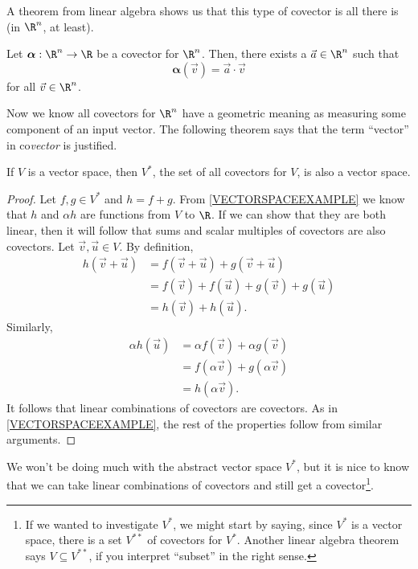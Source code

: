 A theorem from linear algebra shows us that this type of covector
is all there is (in $\R^n$, at least).

\begin{theorem}
	Let $\bm\alpha:\R^n\to \R$ be a covector for $\R^n$.  Then,
	there exists a $\vec a\in \R^n$ such that
	\[
		\bm\alpha (\vec v) = \vec a\cdot \vec v
	\]
	for all $\vec v\in\R^n$.
\end{theorem}


Now we know all covectors for $\R^n$ have a geometric meaning
as measuring some component of an input vector.  The following
theorem says that the term ``vector'' in co\emph{vector} is justified.

\begin{theorem}
	If $V$ is a vector space, then $V^*$, the set of all
	covectors for $V$, is also a vector space.
\end{theorem}
\begin{proof}
    Let $f,g\in V^*$ and $h=f+g$. From \ref{VECTORSPACEEXAMPLE} we know
    that $h$ and $\alpha h$ are functions from $V$ to $\R$. If we can
    show that they are both linear, then it will follow that sums and 
    scalar multiples of covectors are also covectors. Let $\vec v,\vec u\in V$.
    By definition,
    \begin{align*}
        h(\vec v+\vec u) & = f(\vec v+\vec u) + g(\vec v+\vec u) \\
                         & = f(\vec v) + f(\vec u) + g(\vec v) + g(\vec u) \\
                         & = h(\vec v) + h(\vec u).
    \end{align*} 
    Similarly,
    \begin{align*}
        \alpha h(\vec u) & = \alpha f(\vec v) + \alpha g(\vec v) \\
                         & = f(\alpha\vec v) + g(\alpha\vec v) \\
                         & = h(\alpha\vec v).
    \end{align*}    
    It follows that linear combinations of covectors are covectors. As in 
    \ref{VECTORSPACEEXAMPLE}, the rest of the properties follow from similar
    arguments.
\end{proof}

We won't be doing much with the abstract vector space $V^*$, but it is
nice to know that we can take linear combinations of covectors
and still get a covector\footnote{ If we wanted to investigate $V^*$,
we might start by saying, since $V^*$ is a vector space, there is
a set $V^{**}$ of covectors for $V^*$.  Another linear algebra theorem
says $V\subseteq V^{**}$, if you interpret ``subset'' in the right sense. }.

